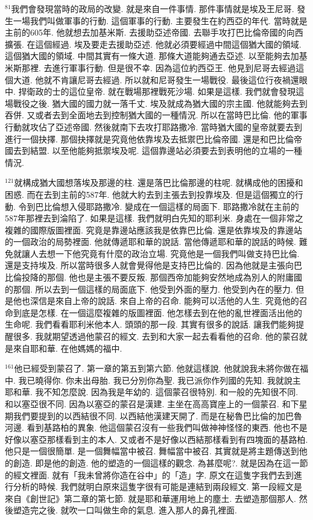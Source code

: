 \documentclass{book}
\begin{document}
$^{81}$我們會發現當時的政局的改變.
就是來自一件事情.
那件事情就是埃及王尼哥.
發生一場我們叫做軍事的行動.
這個軍事的行動.
主要發生在約西亞的年代.
當時就是主前的605年.
他就想去加基米斯.
去援助亞述帝國.
去聯手攻打巴比倫帝國的向西擴張.
在這個經過.
埃及要走去援助亞述.
他就必須要經過中間這個猶大國的領域.
這個猶大國的領域.
中間其實有一條大道.
那條大道能夠通去亞述.
以至能夠去加基米斯那裡.
去進行軍事行動.
但是很不幸.
因為這位約西亞王.
他見到尼哥去經過這個大道.
他就不肯讓尼哥去經過.
所以就和尼哥發生一場戰役.
最後這位行夜禍還眼中.
捍衛政的士的這位皇帝.
就在戰場那裡戰死沙場.
如果是這樣.
我們就會發現這場戰役之後.
猶大國的國力就一落千丈.
埃及就成為猶大國的宗主國.
他就能夠去到吞併.
又或者去到全面地去到控制猶大國的一種情況.
所以在當時巴比倫.
他的軍事行動就攻佔了亞述帝國.
然後就南下去攻打耶路撒冷.
當時猶大國的皇帝就要去到進行一個抉擇.
那個抉擇就是究竟他依靠埃及去抵禦巴比倫帝國.
還是和巴比倫帝國去到結盟.
以至他能夠抵禦埃及呢.
這個靠邊站必須要去到表明他的立場的一種情況.

$^{121}$就構成猶大國想落埃及那邊的柱.
還是落巴比倫那邊的柱呢.
就構成他的困擾和困惑.
而在去到主前的587年.
他就大約去到主張去到投靠埃及.
但是這個獨立的行動.
令到巴比倫想入侵耶路撒冷.
變成在一個這樣的局面下.
耶路撒冷就在主前的587年那裡去到淪陷了.
如果是這樣.
我們就明白先知的耶利米.
身處在一個非常之複雜的國際版圖裡面.
究竟是靠邊站應該我是依靠巴比倫.
還是依靠埃及的靠邊站的一個政治的局勢裡面.
他就傳遞耶和華的說話.
當他傳遞耶和華的說話的時候.
難免就讓人去想一下他究竟有什麼的政治立場.
究竟他是一個我們叫做支持巴比倫.
還是支持埃及.
所以當時很多人就會覺得他是支持巴比倫的.
因為他就是主張向巴比倫投降的那個.
他也是主張不要反叛.
那個西帝加能夠安然地成為別人的附庸國的那個.
所以去到一個這樣的局面底下.
他受到外面的壓力.
他受到內在的壓力.
但是他也深信是來自上帝的說話.
來自上帝的召命.
能夠可以活他的人生.
究竟他的召命到底是怎樣.
在一個這麼複雜的版圖裡面.
他怎樣去到在他的亂世裡面活出他的生命呢.
我們看看耶利米他本人.
頭頭的那一段.
其實有很多的說話.
讓我們能夠提醒很多.
我就期望透過他蒙召的經文.
去到和大家一起去看看他的召命.
他的蒙召就是來自耶和華.
在他媽媽的福中.

$^{161}$他已經受到蒙召了.
第一章的第五到第六節.
他就這樣說.
他就說我未將你做在福中.
我已曉得你.
你未出母胎.
我已分別你為聖.
我已派你作列國的先知.
我就說主耶和華.
我不知怎麼說.
因為我是年幼的.
這個蒙召很特別.
和一般的先知很不同.
和以塞亞很不同.
因為以塞亞的蒙召是漢建.
主坐在高高寶座上的一個蒙召.
和下星期我們要提到的以西結很不同.
以西結他漢建天開了.
而是在秘魯巴比倫的加巴魯河邊.
看到基路柏的異象.
他這個蒙召沒有一些我們叫做神神怪怪的東西.
他也不是好像以塞亞那樣看到主的本人.
又或者不是好像以西結那樣看到有四塊面的基路柏.
他只是一個很簡單.
是一個舞幅當中被召.
舞幅當中被召.
其實就是將主題傳送到他的創造.
即是他的創造.
他的塑造的一個這樣的觀念.
為甚麼呢?.
就是因為在這一節的經文裡面.
就有「我未曾將你造在谷中」的「造」字.
原文在這隻字我們去到進行分析的時候.
我們就明白原來這隻字很有可能是連結到兩段經文.
第一段經文是來自《創世記》第二章的第七節.
就是耶和華運用地上的塵土.
去塑造那個那人.
然後塑造完之後.
就吹一口叫做生命的氣息.
進入那人的鼻孔裡面.
\end{document}
